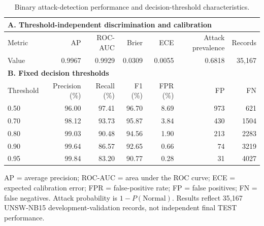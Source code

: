 \begin{table}[t]
\centering
\caption{Binary attack-detection performance and decision-threshold characteristics.}
\label{tab:binary_attack_detection}
\small
\begin{tabular}{lrrrrrr}
\toprule
\multicolumn{7}{l}{\textbf{A. Threshold-independent discrimination and calibration}} \\
\midrule
Metric & AP & ROC-AUC & Brier & ECE & Attack prevalence & Records \\
Value & 0.9967 & 0.9929 & 0.0309 & 0.0055 & 0.6818 & 35,167 \\
\midrule
\multicolumn{7}{l}{\textbf{B. Fixed decision thresholds}} \\
\midrule
Threshold & Precision (\%) & Recall (\%) & F1 (\%) & FPR (\%) & FP & FN \\
\midrule
0.50 & 96.00 & 97.41 & 96.70 & 8.69 & 973 & 621 \\
0.70 & 98.12 & 93.73 & 95.87 & 3.84 & 430 & 1504 \\
0.80 & 99.03 & 90.48 & 94.56 & 1.90 & 213 & 2283 \\
0.90 & 99.64 & 86.57 & 92.65 & 0.66 & 74 & 3219 \\
0.95 & 99.84 & 83.20 & 90.77 & 0.28 & 31 & 4027 \\
\bottomrule
\end{tabular}
\vspace{3pt}
\parbox{\textwidth}{\footnotesize AP = average precision; ROC-AUC = area under the ROC curve; ECE = expected calibration error; FPR = false-positive rate; FP = false positives; FN = false negatives. Attack probability is $1-P(\mathrm{Normal})$. Results reflect 35,167 UNSW-NB15 development-validation records, not independent final TEST performance.}
\end{table}
